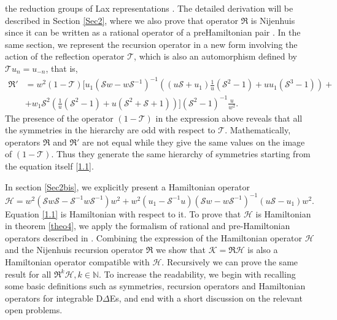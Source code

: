 \documentclass{article}
\numberwithin{equation}{section}
\begin{document}
the reduction groups of Lax representations \cite{31}.
The detailed derivation will be described in Section \ref{Sec2}, where
we also prove that operator $\mathfrak{R}$ is Nijenhuis since it can
be written as a rational operator of a preHamiltonian pair \cite{4, 41}.
In the same section, we represent the recursion operator in a new form
involving the action of the reflection operator $\mathcal{T}$, which is also an automorphism defined by
$\mathcal{T} u_n = u_{-n}$, that is,
	\begin{equation}\label{RT}
		\begin{split}
			\mathfrak{R}' & = w^2 \left(1-\mathcal{T}\right) \Bigg[
u_1 \left( \mathcal{S} w - w \mathcal{S}^{-1} \right)^{-1} \left( \left( u
\mathcal{S}+u_1 \right)\frac{1}{u}\left( \mathcal{S}^2-1\right) + u
u_1\left(\mathcal{S}^3-1\right) \right)+ \\ & + w_1 \mathcal{S}^2 \left(\frac{1}{u}\left(\mathcal{S}^2-1\right)+u
\left(\mathcal{S}^2+\mathcal{S}+1\right)\right) \Bigg]
(\mathcal{S}^2-1)^{-1}\frac{u}{w^2} .
		\end{split}
	\end{equation}
The presence of the operator $\left(1- \mathcal{T}\right)$
in the expression above reveals that all the symmetries in the hierarchy are odd
with respect to $\mathcal{T}$. Mathematically, operators $\mathfrak{R}$ and $\mathfrak{R}'$
are not equal while they give the same values on the image of $\left(1- \mathcal{T}\right)$. Thus they generate
the same hierarchy of symmetries starting from the equation itself \eqref{1.1}.

In section \ref{Sec2bis}, we explicitly present a Hamiltonian operator
\begin{equation}
		\mathcal{H} = w^2 \left(\mathcal{S} w \mathcal{S} -
\mathcal{S}^{-1}w \mathcal{S}^{-1} \right) w^2+ w^2\left(u_1-\mathcal{S}^{-1}
u\right) \left(\mathcal{S} w - w \mathcal{S}^{-1}\right)^{-1} (u
\mathcal{S}-u_1) w^2 .
	\end{equation}
Equation \eqref{1.1} is Hamiltonian with respect to it.
To prove that $\mathcal{H}$ is Hamiltonian in theorem \ref{theo4}, we apply the formalism
of rational and pre-Hamiltonian operators described in \cite{4, 42}.
Combining the expression of the Hamiltonian operator
$\mathcal{H}$ and the Nijenhuis recursion operator $\mathfrak{R}$ we show that
 $\mathcal{K} = \mathfrak{R}\mathcal{H}$ is also a Hamiltonian operator compatible with $\mathcal{H}$.
 Recursively we can prove the same result for all $\mathfrak{R}^k\mathcal{H}, k\in \mathbb{N}.$
 To increase the readability, we begin with recalling some basic definitions such as symmetries, recursion operators and Hamiltonian operators for integrable D$\Delta$Es, and
 end with a short discussion on the relevant open problems.
\end{document}

